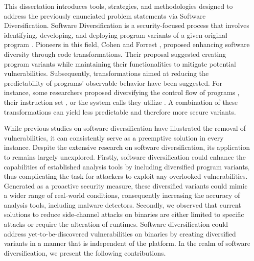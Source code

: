 This dissertation introduces tools, strategies, and methodologies designed to address the previously enunciated problem statements via Software Diversification.
Software Diversification is a security-focused process that involves identifying, developing, and deploying program variants of a given original program \cite{okhravi2013survey}.
Pioneers in this field, Cohen \etal \cite{cohen1993operating} and Forrest \etal \cite{595185}, proposed enhancing software diversity through code transformations. 
Their proposal suggested creating program variants while maintaining their functionalities to mitigate potential vulnerabilities.
Subsequently, transformations aimed at reducing the predictability of programs' observable behavior have been suggested. For instance, some researchers proposed diversifying the control flow of programs \cite{davi2015isomeron}, their instruction set \cite{barrantes2003randomized}, or the system calls they utilize \cite{Chew02mitigatingbuffer}. 
A combination of these transformations can yield less predictable and therefore more secure variants.

While previous studies on software diversification have illustrated the removal of vulnerabilities, it can consistently serve as a preemptive solution in every instance. 
Despite the extensive research on software diversification, its application to \Wasm remains largely unexplored. 
Firstly, software diversification could enhance the capabilities of established \Wasm analysis tools by including diversified program variants, thus complicating the task for attackers to exploit any overlooked vulnerabilities. 
Generated as a proactive security measure, these diversified variants could mimic a wider range of real-world conditions, consequently increasing the accuracy of \Wasm analysis tools, including \Wasm malware detectors. 
Secondly, we observed that current solutions to reduce side-channel attacks on \Wasm binaries are either limited to specific attacks or require the alteration of runtimes. 
Software diversification could address yet-to-be-discovered vulnerabilities on \Wasm binaries by creating diversified variants in a manner that is independent of the platform. 
In the realm of software diversification, we present the following contributions.


